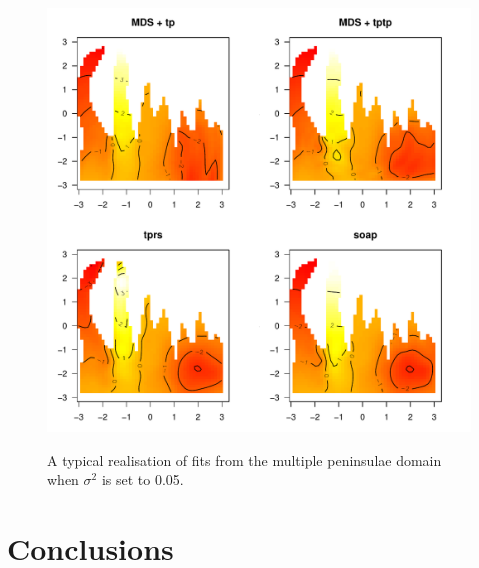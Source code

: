 \documentclass[a4paper,10pt]{article}
\begin{document}
\begin{figure}
\centering
\includegraphics[width=6in]{figs/wt2-fit-005.pdf} \\
\caption{A typical realisation of fits from the multiple peninsulae domain when $\sigma^2$ is set to 0.05.}
\label{wt2-fit-0.05}
\end{figure}



\section{Conclusions}
\end{document}
